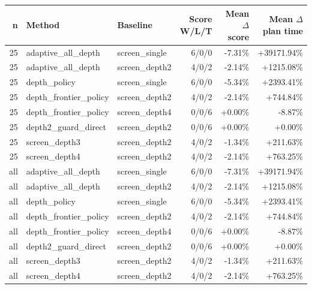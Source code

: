 \begin{tabular}{rllrrr}
\toprule
n & Method & Baseline & Score W/L/T & Mean $\Delta$ score & Mean $\Delta$ plan time \\
\midrule
25 & adaptive\_all\_depth & screen\_single & 6/0/0 & -7.31\% & +39171.94\% \\
25 & adaptive\_all\_depth & screen\_depth2 & 4/0/2 & -2.14\% & +1215.08\% \\
25 & depth\_policy & screen\_single & 6/0/0 & -5.34\% & +2393.41\% \\
25 & depth\_frontier\_policy & screen\_depth2 & 4/0/2 & -2.14\% & +744.84\% \\
25 & depth\_frontier\_policy & screen\_depth4 & 0/0/6 & +0.00\% & -8.87\% \\
25 & depth2\_guard\_direct & screen\_depth2 & 0/0/6 & +0.00\% & +0.00\% \\
25 & screen\_depth3 & screen\_depth2 & 4/0/2 & -1.34\% & +211.63\% \\
25 & screen\_depth4 & screen\_depth2 & 4/0/2 & -2.14\% & +763.25\% \\
all & adaptive\_all\_depth & screen\_single & 6/0/0 & -7.31\% & +39171.94\% \\
all & adaptive\_all\_depth & screen\_depth2 & 4/0/2 & -2.14\% & +1215.08\% \\
all & depth\_policy & screen\_single & 6/0/0 & -5.34\% & +2393.41\% \\
all & depth\_frontier\_policy & screen\_depth2 & 4/0/2 & -2.14\% & +744.84\% \\
all & depth\_frontier\_policy & screen\_depth4 & 0/0/6 & +0.00\% & -8.87\% \\
all & depth2\_guard\_direct & screen\_depth2 & 0/0/6 & +0.00\% & +0.00\% \\
all & screen\_depth3 & screen\_depth2 & 4/0/2 & -1.34\% & +211.63\% \\
all & screen\_depth4 & screen\_depth2 & 4/0/2 & -2.14\% & +763.25\% \\
\bottomrule
\end{tabular}
